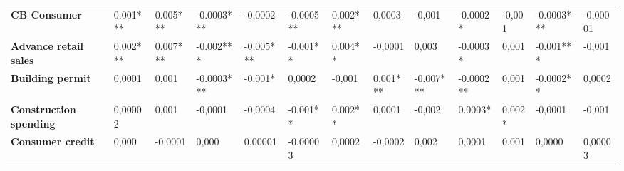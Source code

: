 \begin{landscape}
\begin{table}[]
{\begin{tabular}{@{}lllllllllllll@{}}
\textbf{CB Consumer}              & 0.001***                                & 0.005***                                & -0.0003***                              & -0,0002                                 & -0.0005**                               & 0.002***                                & 0,0003                                  & -0,001                                  & -0.0002*                                & -0,001                                  & -0.0003***                              & -0,00001                                \\
\textbf{Advance retail sales}     & 0.002***                                & 0.007***                                & -0.002***                               & -0.005***                               & -0.001**                                & 0.004**                                 & -0,0001                                 & 0,003                                   & -0.0003*                                & 0,001                                   & -0.001***                               & -0,001                                  \\
\textbf{Building permit}          & 0,0001                                  & 0,001                                   & -0.0003***                              & -0.001*                                 & 0,0002                                  & -0,001                                  & 0.001***                                & -0.007***                               & -0.0002**                               & 0,001                                   & -0.0002**                               & 0,0002                                  \\
\textbf{Construction spending}    & 0,00002                                 & 0,001                                   & -0,0001                                 & -0,0004                                 & -0.001**                                & 0.002**                                 & 0,0001                                  & -0,002                                  & 0.0003*                                 & 0.002*                                  & -0,0001                                 & -0,001                                  \\
\textbf{Consumer credit}          & 0,000                                   & -0,0001                                 & 0,000                                   & 0,00001                                 & -0,00003                                & 0,0002                                  & -0,0002                                 & 0,002                                   & 0,0001                                  & 0,001                                   & 0,0000                                  & 0,00003                                 \\

\end{tabular}}
\end{table}
\end{landscape}
